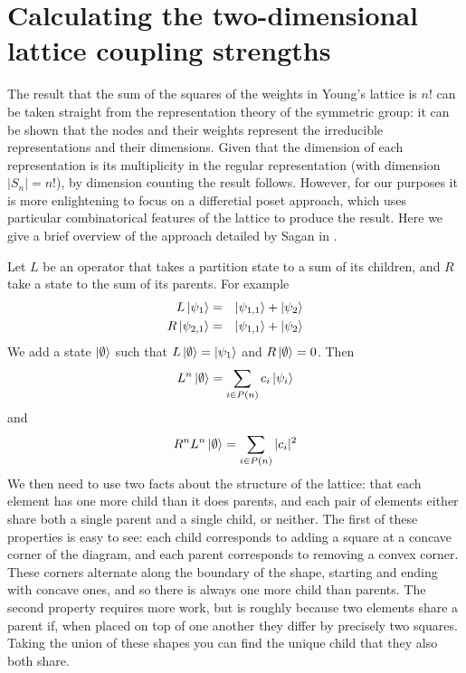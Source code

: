 
\section{Calculating the two-dimensional lattice coupling strengths}

 The result that the sum of the squares of the weights in Young's lattice is $n!$ can be taken straight from the representation theory of the symmetric group: it can be shown that the nodes and their weights represent the irreducible representations and their dimensions. Given that the dimension of each representation is its multiplicity in the regular representation (with dimension $|S_n| = n!$), by dimension counting the result follows. However, for our purposes it is more enlightening to focus on a differetial poset approach, which uses particular combinatorical features of the lattice to produce the result. Here we give a brief overview of the approach detailed by Sagan in \cite{Sagan:2001p6568}.

Let $L$ be an operator that takes a partition state to a sum of its
children, and $R$ take a state to the sum of its parents. For example\begin{eqnarray*}
L\left\vert\psi_{1}\right\rangle & = & \left\vert\psi_{1,1}\right\rangle+\left\vert\psi_{2}\right\rangle\\
R\left\vert\psi_{2,1}\right\rangle & = & \left\vert\psi_{1,1}\right\rangle+\left\vert\psi_{2}\right\rangle\end{eqnarray*}
We add a state $\left\vert\emptyset\right\rangle$ such that $L\left\vert\emptyset\right\rangle=\left\vert\psi_{1}\right\rangle$
and $R\left\vert\emptyset\right\rangle=0$. Then \[
L^{n}\left\vert\emptyset\right\rangle=\sum_{i\in P(n)}c_{i}\left\vert\psi_{i}\right\rangle\]
 and\[
R^{n}L^{n}\left\vert\emptyset\right\rangle=\sum_{i\in P(n)}|c_{i}|^{2}\]
We then need to use two facts about the structure of the lattice:
that each element has one more child than it does parents, and each
pair of elements either share both a single parent and a single child,
or neither. The first of these properties is easy to see: each child
corresponds to adding a square at a concave corner of the diagram,
and each parent corresponds to removing a convex corner. These corners
alternate along the boundary of the shape, starting and ending with
concave ones, and so there is always one more child than parents.
The second property requires more work, but is roughly because two
elements share a parent if, when placed on top of one another they
differ by precisely two squares. Taking the union of these shapes
you can find the unique child that they also both share.

